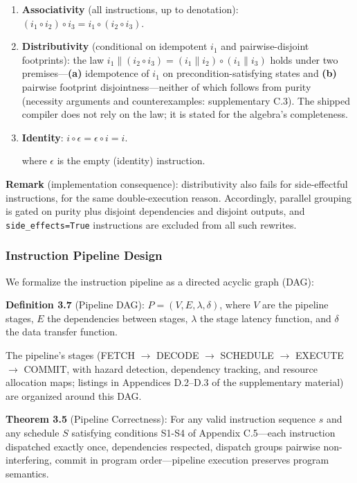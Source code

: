 \documentclass[
  sigconf,
  anonymous]{acmart}
\begin{document}
\begin{enumerate}
\def\labelenumi{\arabic{enumi}.}
\item
  \textbf{Associativity} (all instructions, up to denotation):
  \((i_1 \circ i_2) \circ i_3 = i_1 \circ (i_2 \circ i_3)\).
\item
  \textbf{Distributivity} (conditional on idempotent \(i_1\) and
  pairwise-disjoint footprints): the law
  \(i_1 \parallel (i_2 \circ i_3) = (i_1 \parallel i_2) \circ (i_1 \parallel i_3)\)
  holds under two premises---\textbf{(a)} idempotence of \(i_1\) on
  precondition-satisfying states and \textbf{(b)} pairwise footprint
  disjointness---neither of which follows from purity (necessity
  arguments and counterexamples: supplementary C.3). The shipped
  compiler does not rely on the law; it is stated for the algebra's
  completeness.
\item
  \textbf{Identity}: \(i \circ \epsilon = \epsilon \circ i = i\).

  where \(\epsilon\) is the empty (identity) instruction.
\end{enumerate}

\textbf{Remark} (implementation consequence): distributivity also fails
for side-effectful instructions, for the same double-execution reason.
Accordingly, parallel grouping is gated on purity plus disjoint
dependencies and disjoint outputs, and \texttt{side\_effects=True}
instructions are excluded from all such rewrites.

\subsubsection{Instruction Pipeline
Design}\label{instruction-pipeline-design}

We formalize the instruction pipeline as a directed acyclic graph (DAG):

\textbf{Definition 3.7} (Pipeline DAG): \(P = (V, E, \lambda, \delta)\),
where \(V\) are the pipeline stages, \(E\) the dependencies between
stages, \(\lambda\) the stage latency function, and \(\delta\) the data
transfer function.

The pipeline's stages (FETCH \(\rightarrow\) DECODE \(\rightarrow\)
SCHEDULE \(\rightarrow\) EXECUTE \(\rightarrow\) COMMIT, with hazard
detection, dependency tracking, and resource allocation maps; listings
in Appendices D.2--D.3 of the supplementary material) are organized
around this DAG.

\textbf{Theorem 3.5} (Pipeline Correctness): For any valid instruction
sequence \(s\) and any schedule \(S\) satisfying conditions S1-S4 of
Appendix C.5---each instruction dispatched exactly once, dependencies
respected, dispatch groups pairwise non-interfering, commit in program
order---pipeline execution preserves program semantics.
\end{document}
